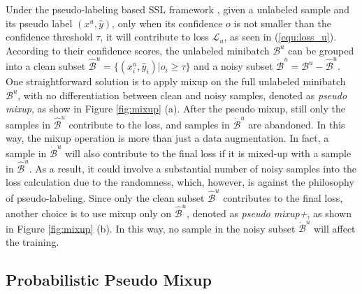 \documentclass{article}
\begin{document}
Under the pseudo-labeling based SSL framework \cite{lee2013pseudo,DBLP:conf/nips/SohnBCZZRCKL20,DBLP:conf/cvpr/PhamDXL21,DBLP:conf/cvpr/CaiRMFTS21}, given a unlabeled sample and its pseudo label $(x^u,\hat{y})$, only when its confidence $o$ is not smaller than the confidence threshold $\tau$, 
it will contribute to loss $\mathcal{L}_u$, as seen in (\ref{equ:loss_u}). According to their confidence scores, the unlabeled minibatch $\mathcal{B}^u$ can be grouped into a clean subset $\hat{\mathcal{B}}^u=\{(x^u_i,\hat{y}_i)|o_i\geq\tau\}$ and a noisy subset $\dot{\mathcal{B}}^u=\mathcal{B}^u-\hat{\mathcal{B}}^u$. 
One straightforward solution is to apply mixup on the full unlabeled minibatch $\mathcal{B}^u$, with no differentiation between clean and noisy samples, denoted as \emph{pseudo mixup}, as show in Figure \ref{fig:mixup} (a). After the pseudo mixup, still only the samples in $\hat{\mathcal{B}}^u$ contribute to the loss, and samples in $\dot{\mathcal{B}}^u$ are abandoned. In this way, the mixup operation is more than just a data augmentation. In fact, a sample in $\dot{\mathcal{B}}^u$ will also contribute to the final loss if it is mixed-up with a sample in $\hat{\mathcal{B}}^u$. As a result, it could involve a substantial number of noisy samples into the loss calculation due to the randomness, which, however, is against the philosophy of pseudo-labeling. Since only the clean subset $\hat{\mathcal{B}}^u$ contributes to the final loss, another choice is to use mixup only on $\hat{\mathcal{B}}^u$, denoted as \emph{pseudo mixup+}, as shown in Figure \ref{fig:mixup} (b). In this way, no sample in the noisy subset $\dot{\mathcal{B}}^u$ will affect the training. 


\subsection{Probabilistic Pseudo Mixup}
\end{document}
